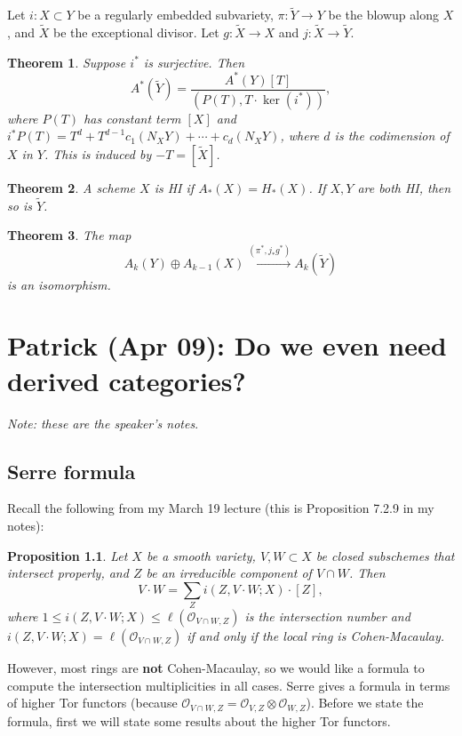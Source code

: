 \documentclass[leqno, openany]{memoir}
\newtheorem{thm}{Theorem}[section]
\theoremstyle{definition}
\theoremstyle{remark}
\theoremstyle{plain}
\newtheorem*{prop*}{Proposition}
\theoremstyle{definition}
\theoremstyle{remark}
\newcommand{\mc}[1]{\mathcal{#1}}
\newcommand{\wt}[1]{\widetilde{#1}}
\begin{document}
Let $i \colon X \subset Y$ be a regularly embedded subvariety, $\pi \colon \wt{Y} \to Y$ be the blowup along $X$, and $\wt{X}$ be the exceptional divisor. Let $g \colon \wt{X} \to X$ and $j \colon \wt{X} \to \wt{Y}$.

\begin{thm}
    Suppose $i^*$ is surjective. Then
    \[ A^*(\wt{Y}) = \frac{A^*(Y)[T]}{(P(T), T \cdot \ker(i^*))}, \]
    where $P(T)$ has constant term $[X]$ and $i^* P(T) = T^d + T^{d-1} c_1(N_X Y) + \cdots + c_d(N_X Y)$, where $d$ is the codimension of $X$ in $Y$. This is induced by $-T = [\wt{X}]$.
\end{thm}

\begin{thm}
    A scheme $X$ is HI if $A_*(X) = H_*(X)$. If $X, Y$ are both HI, then so is $\wt{Y}$.
\end{thm}

\begin{thm}
    The map
    \[ A_k(Y) \oplus A_{k-1}(X) \xrightarrow{(\pi^*, j_* g^*)} A_k(\wt{Y}) \]
    is an isomorphism.
\end{thm}

\chapter{Patrick (Apr 09): Do we even need derived categories?}%
\label{cha:patrick_apr_09_serre_intersection_formula}

\textit{Note: these are the speaker's notes}.

\section{Serre formula}%
\label{sec:serre_formula}

Recall the following from my March 19 lecture (this is Proposition 7.2.9 in my notes):
\begin{prop*}
    Let $X$ be a smooth variety, $V, W \subset X$ be closed subschemes that intersect properly, and $Z$ be an irreducible component of $V \cap W$. Then
    \[ V \cdot W = \sum_Z i(Z, V \cdot W; X) \cdot [Z], \]
    where $1 \leq i(Z, V \cdot W; X) \leq \ell(\mc{O}_{V \cap W, Z})$ is the intersection number and $i(Z, V \cdot W; X) = \ell(\mc{O}_{V \cap W, Z})$ if and only if the local ring is Cohen-Macaulay.
\end{prop*}

However, most rings are \textbf{not} Cohen-Macaulay, so we would like a formula to compute the intersection multiplicities in all cases. Serre gives a formula in terms of higher Tor functors (because $\mc{O}_{V \cap W, Z} = \mc{O}_{V, Z} \otimes \mc{O}_{W, Z}$). Before we state the formula, first we will state some results about the higher Tor functors. 
\end{document}
